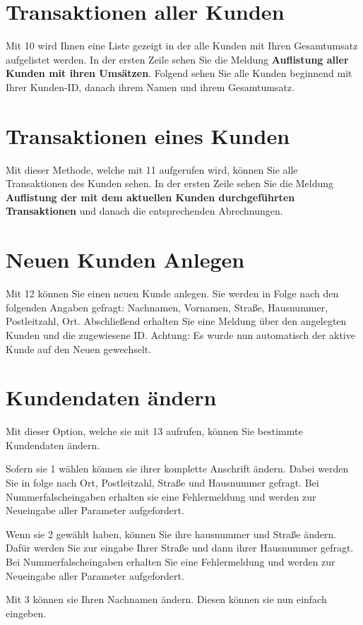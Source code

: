 ﻿\documentclass[a4paper,12pt,titlepage]{article}
\newcommand\enquote[1]{{\ttfamily \bfseries #1}}
\begin{document}
\section{Transaktionen aller Kunden}
Mit 10 wird Ihnen eine Liste gezeigt in der alle Kunden mit Ihren Gesamtumsatz aufgelistet werden.
In der ersten Zeile sehen Sie die Meldung \enquote{Auflistung aller Kunden mit ihren Umsätzen}.
Folgend sehen Sie alle Kunden beginnend mit Ihrer Kunden-ID, danach ihrem Namen und ihrem Gesamtumsatz.

\section{Transaktionen eines Kunden}
Mit dieser Methode, welche mit 11 aufgerufen wird, können Sie alle Transaktionen des Kunden sehen.
In der ersten Zeile sehen Sie die Meldung \enquote{Auflistung der mit dem aktuellen Kunden durchgeführten Transaktionen}
 und danach die entsprechenden Abrechnungen.

\section{Neuen Kunden Anlegen}
Mit 12 können Sie einen neuen Kunde anlegen.
Sie werden in Folge nach den folgenden Angaben gefragt: Nachnamen, Vornamen, Straße, Hausnummer, Postleitzahl, Ort.
Abschließend erhalten Sie eine Meldung über den angelegten Kunden und die zugewiesene ID.
Achtung: Es wurde nun automatisch der aktive Kunde auf den Neuen gewechselt.

\section{Kundendaten ändern}
Mit dieser Option, welche sie mit 13 aufrufen, können Sie bestimmte Kundendaten ändern.

Sofern sie 1 wählen können sie ihrer komplette Anschrift ändern.
Dabei werden Sie in folge nach Ort, Postleitzahl, Straße und Hausnummer gefragt.
Bei Nummerfalscheingaben erhalten sie eine Fehlermeldung und werden zur Neueingabe aller Parameter aufgefordert.

Wenn sie 2 gewählt haben, können Sie ihre hausnummer und Straße ändern.
Dafür werden Sie zur eingabe Ihrer Straße und dann ihrer Hausnummer gefragt.
Bei Nummerfalscheingaben erhalten Sie eine Fehlermeldung und werden zur Neueingabe aller Parameter aufgefordert.

Mit 3 können sie Ihren Nachnamen ändern. Diesen können sie nun einfach eingeben.
\end{document}
